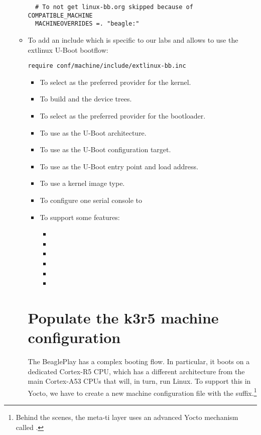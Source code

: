 \begin{itemize}
\begin{itemize}
\begin{verbatim}
  # To not get linux-bb.org skipped because of COMPATIBLE_MACHINE
  MACHINEOVERRIDES =. "beagle:"
\end{verbatim}
  \item To add an include which is specific to our labs
  and allows to use the extlinux U-Boot bootflow:
\begin{verbatim}
require conf/machine/include/extlinux-bb.inc
\end{verbatim}
  \else
\begin{itemize}
  \item To select  as the preferred provider
    for the kernel.
  \item To build  and the
     device trees.
  \item To select  as the preferred provider
    for the bootloader.
  \item To use  as the U-Boot architecture.
  \item To use  as the U-Boot
    configuration target.
  \item To use  as the U-Boot entry point and load
    address.
  \item To use a  kernel image type.
  \item To configure one serial console to 
  \item To support some features:
    \begin{itemize}
      \item {}
      \item {}
      \item {}
      \item {}
      \item {}
      \item {}
    \end{itemize}
  \fi
\fi
\end{itemize}

\if{}
\section{Populate the k3r5 machine configuration}

The BeaglePlay has a complex booting flow. In particular, it boots on a dedicated Cortex-R5 CPU,
 which has a different architecture from the main Cortex-A53 CPUs that will, in turn, run Linux.
 To support this in Yocto, we have to create a new machine configuration file with the 
suffix.\footnote{Behind the scenes, the meta-ti layer uses an advanced Yocto mechanism called .}


\end{itemize}
\end{itemize}
